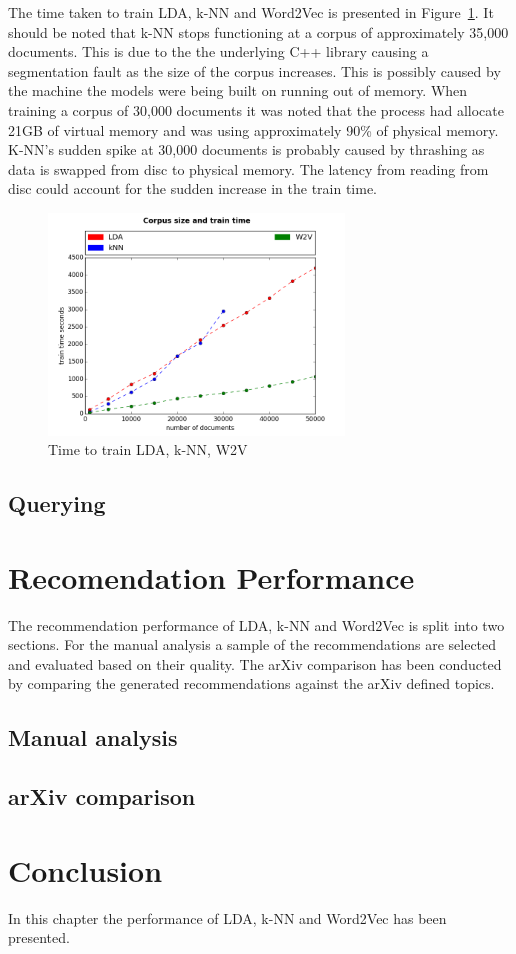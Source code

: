 The time taken to train LDA, k-NN and Word2Vec is presented in Figure~\ref{fig:TrainAll}.
It should be noted that k-NN stops functioning at a corpus of approximately 35,000 documents.
This is due to the the underlying C++ library causing a segmentation fault as the size of the corpus increases.
This is possibly caused by the machine the models were being built on running out of memory.
When training a corpus of 30,000 documents it was noted that the process had allocate 21GB of virtual memory and was using approximately 90\% of physical memory.
K-NN's sudden spike at 30,000 documents is probably caused by thrashing as data is swapped from disc to physical memory.
The latency from reading from disc could account for the sudden increase in the train time. 

\begin{figure}[h]
    \centering
        \includegraphics[width=0.7\textwidth]{Figures/TrainAll.png}
    \caption{Time to train LDA, k-NN, W2V}
    \label{fig:TrainAll}
\end{figure}

\subsection{Querying}

\section{Recomendation Performance}
The recommendation performance of LDA, k-NN and Word2Vec is split into two sections.
For the manual analysis a sample of the recommendations are selected and evaluated based on their quality.
The arXiv comparison has been conducted by comparing the generated recommendations against the arXiv defined topics.

\subsection{Manual analysis}
\subsection{arXiv comparison}

\section{Conclusion}
In this chapter the performance of LDA, k-NN and Word2Vec has been presented.
